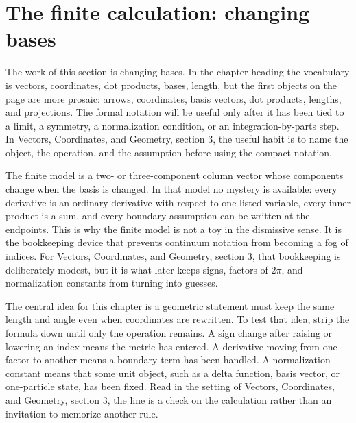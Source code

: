 \section{The finite calculation: changing bases}













The work of this section is changing bases.  In the chapter heading the vocabulary is vectors, coordinates, dot products, bases, length, but the first objects on the page are more prosaic: arrows, coordinates, basis vectors, dot products, lengths, and projections.  The formal notation will be useful only after it has been tied to a limit, a symmetry, a normalization condition, or an integration-by-parts step.  In Vectors, Coordinates, and Geometry, section 3, the useful habit is to name the object, the operation, and the assumption before using the compact notation.

The finite model is a two- or three-component column vector whose components change when the basis is changed.  In that model no mystery is available: every derivative is an ordinary derivative with respect to one listed variable, every inner product is a sum, and every boundary assumption can be written at the endpoints.  This is why the finite model is not a toy in the dismissive sense.  It is the bookkeeping device that prevents continuum notation from becoming a fog of indices.  For Vectors, Coordinates, and Geometry, section 3, that bookkeeping is deliberately modest, but it is what later keeps signs, factors of \(2\pi\), and normalization constants from turning into guesses.

The central idea for this chapter is a geometric statement must keep the same length and angle even when coordinates are rewritten.  To test that idea, strip the formula down until only the operation remains.  A sign change after raising or lowering an index means the metric has entered.  A derivative moving from one factor to another means a boundary term has been handled.  A normalization constant means that some unit object, such as a delta function, basis vector, or one-particle state, has been fixed.  Read in the setting of Vectors, Coordinates, and Geometry, section 3, the line is a check on the calculation rather than an invitation to memorize another rule.

